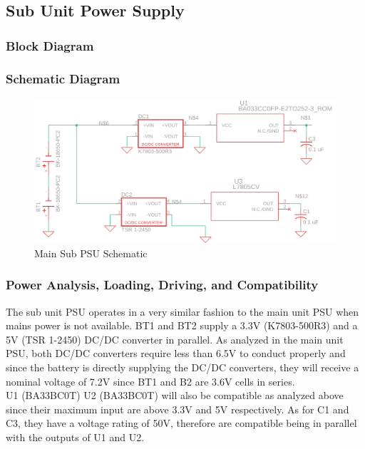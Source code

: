 \subsection{Sub Unit Power Supply}
\subsubsection{Block Diagram}
\subsubsection{Schematic Diagram}
\begin{landscape}
  \begin{center}
  \begin{figure}[H]
    \includegraphics[width=1.6\textwidth, left]{../Modular Design/Sub-Unit-PSU/Figures/sub-unit-psu.png}
    \caption{Main Sub PSU Schematic}
    \label{fig:sub-psu-schematic}
  \end{figure}
  \end{center}
\end{landscape}
\subsubsection{Power Analysis, Loading, Driving, and Compatibility}
The sub unit PSU operates in a very similar fashion to the main unit PSU when mains power is not available. BT1 and BT2 supply a 3.3\si{\V} (K7803-500R3) \cite{K7803500R3} and a 5\si{\V} (TSR 1-2450) \cite{TSR12450} DC/DC converter in parallel. As analyzed in the main unit PSU, both DC/DC converters require less than 6.5\si{\V} to conduct properly and since the battery is directly supplying the DC/DC converters, they will receive a nominal voltage of 7.2\si{\V} since BT1 and B2 are 3.6\si{\V} cells in series.\\ U1 (BA33BC0T) \cite{BA33BC0T} U2 (BA33BC0T) will also be compatible as analyzed above since their maximum input are above 3.3\si{\V} and 5\si{\V} respectively. As for C1 and C3, they have a voltage rating of 50\si{\V}, therefore are compatible being in parallel with the outputs of U1 and U2.
